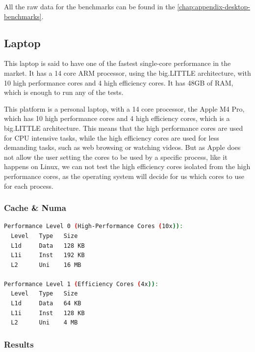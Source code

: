 All the raw data for the benchmarks can be found in the \autoref{chap:appendix-desktop-benchmarks}.

\subsection{Laptop}
This laptop is said to have one of the fastest single-core performance in the market. It has a 14 core ARM processor, using the big.LITTLE architecture, with 10 high performance cores and 4 high efficiency cores. It has 48GB of RAM, which is enough to run any of the tests.


This platform is a personal laptop, with a 14 core processor, the Apple M4 Pro, which has 10 high performance cores and 4 high efficiency cores, which is a big.LITTLE architecture. This means that the high performance cores are used for CPU intensive tasks, while the high efficiency cores are used for less demanding tasks, such as web browsing or watching videos. But as Apple does not allow the user setting the cores to be used by a specific process, like it happens on Linux, we can not test the high efficiency cores isolated from the high performance cores, as the operating system will decide for us which cores to use for each process. 

\subsubsection{Cache \& Numa}

\begin{lstlisting}[language=bash, caption={Cache of the Apple M4 Pro by performance level}, label={lst:apple-cache}]
Performance Level 0 (High-Performance Cores (10x)):
  Level   Type   Size
  L1d     Data   128 KB
  L1i     Inst   192 KB
  L2      Uni    16 MB

Performance Level 1 (Efficiency Cores (4x)):
  Level   Type   Size
  L1d     Data   64 KB
  L1i     Inst   128 KB
  L2      Uni    4 MB
\end{lstlisting}

\subsubsection{Results}






